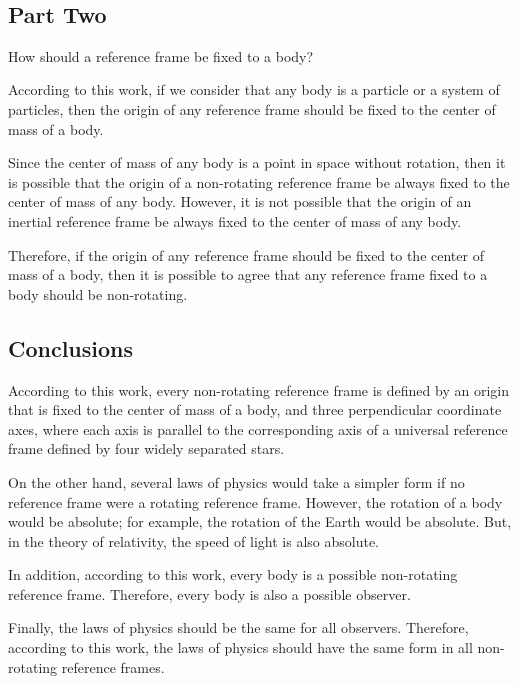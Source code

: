 \documentclass[11pt]{article}
\begin{document}
\newpage \enlargethispage{0em}

\ \vspace{-0.9em}

{\centering\subsection*{Part Two}}

\par How should a reference frame be fixed to a body?
\medskip
\par According to this work, if we consider that any body is a particle or a system of particles, then the origin of any reference frame should be fixed to the center of mass of a body.
\medskip
\par Since the center of mass of any body is a point in space without rotation, then it is possible that the origin of a non-rotating reference frame be always fixed to the center of mass of any body. However, it is not possible that the origin of an inertial reference frame be always fixed to the center of mass of any body.
\medskip
\par Therefore, if the origin of any reference frame should be fixed to the center of mass of a body, then it is possible to agree that any reference frame fixed to a body should be non-rotating.

\bigskip

{\centering\subsection*{Conclusions}}

\par According to this work, every non-rotating reference frame is defined by an origin that is fixed to the center of mass of a body, and three perpendicular coordinate axes, where each axis is parallel to the corresponding axis of a universal reference frame defined by four widely separated stars.
\medskip
\par On the other hand, several laws of physics would take a simpler form if no reference frame were a rotating reference frame. However, the rotation of a body would be absolute; for example, the rotation of the Earth would be absolute. But, in the theory of relativity, the speed of light is also absolute.
\medskip
\par In addition, according to this work, every body is a possible non-rotating reference frame. Therefore, every body is also a possible observer.
\medskip
\par Finally, the laws of physics should be the same for all observers. Therefore, according to this work, the laws of physics should have the same form in all non-rotating reference frames.
\end{document}
